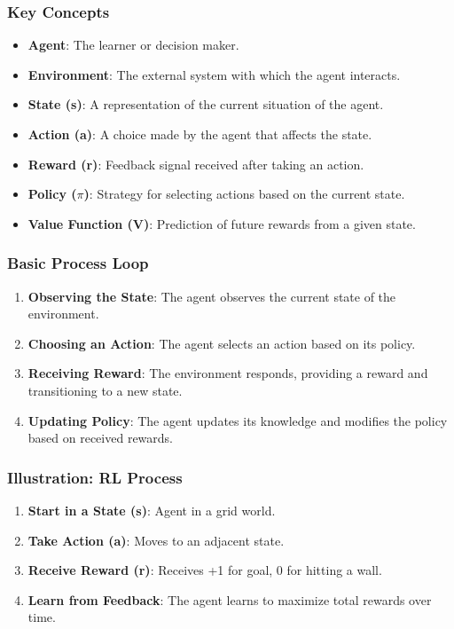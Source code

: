 \documentclass[aspectratio=169]{beamer}
\begin{document}
\begin{frame}[fragile]
    \frametitle{Key Concepts}
    \begin{itemize}
        \item \textbf{Agent}: The learner or decision maker.
        \item \textbf{Environment}: The external system with which the agent interacts.
        \item \textbf{State (s)}: A representation of the current situation of the agent.
        \item \textbf{Action (a)}: A choice made by the agent that affects the state.
        \item \textbf{Reward (r)}: Feedback signal received after taking an action.
        \item \textbf{Policy ($\pi$)}: Strategy for selecting actions based on the current state.
        \item \textbf{Value Function (V)}: Prediction of future rewards from a given state.
    \end{itemize}
\end{frame}

\begin{frame}[fragile]
    \frametitle{Basic Process Loop}
    \begin{enumerate}
        \item \textbf{Observing the State}: The agent observes the current state of the environment.
        \item \textbf{Choosing an Action}: The agent selects an action based on its policy.
        \item \textbf{Receiving Reward}: The environment responds, providing a reward and transitioning to a new state.
        \item \textbf{Updating Policy}: The agent updates its knowledge and modifies the policy based on received rewards.
    \end{enumerate}
\end{frame}

\begin{frame}[fragile]
    \frametitle{Illustration: RL Process}
    \begin{enumerate}
        \item \textbf{Start in a State (s)}: Agent in a grid world.
        \item \textbf{Take Action (a)}: Moves to an adjacent state.
        \item \textbf{Receive Reward (r)}: Receives +1 for goal, 0 for hitting a wall.
        \item \textbf{Learn from Feedback}: The agent learns to maximize total rewards over time.
    \end{enumerate}
\end{frame}
\end{document}
